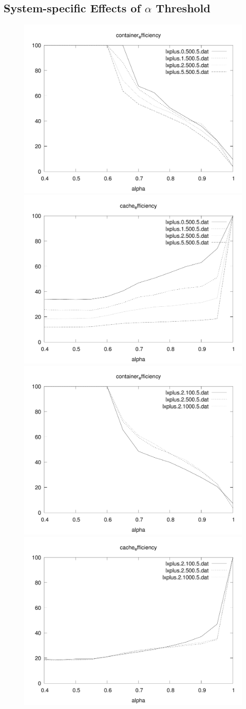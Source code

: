 \documentclass[sigconf]{acmart}
\begin{document}
\subsection{System-specific Effects of $\alpha$ Threshold}

\begin{figure}
\includegraphics[width=0.48\linewidth]{curated/sensitivity/container_efficiency_cache_percent_plt.pdf}
\hfill
\includegraphics[width=0.48\linewidth]{curated/sensitivity/cache_efficiency_cache_percent_plt.pdf}
\includegraphics[width=0.48\linewidth]{curated/sensitivity/container_efficiency_request_percent_plt.pdf}
\hfill
\includegraphics[width=0.48\linewidth]{curated/sensitivity/cache_efficiency_request_percent_plt.pdf}

\end{figure}
\end{document}
